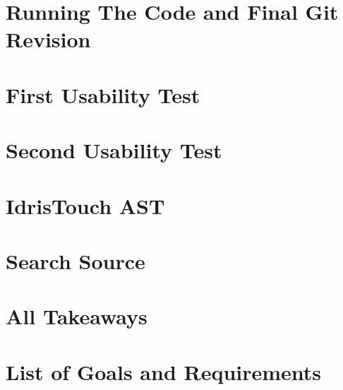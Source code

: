 \appendix
\label{Appendix}
\chapter{Running The Code and Final Git Revision}

\chapter{First Usability Test}
\label{chap:FirstUsabilityTest}

\chapter{Second Usability Test}
\label{chap:SecondUsabilityTest}

\chapter{IdrisTouch AST}
\label{chap:IdrisTouch_AST}



\chapter{Search Source}
\label{chap:SearchSource}

\chapter{All Takeaways}
\label{chap:AllTakeaways}


\chapter{List of Goals and Requirements}
\label{chap:ListOfAllGoalsAndRequirements}
